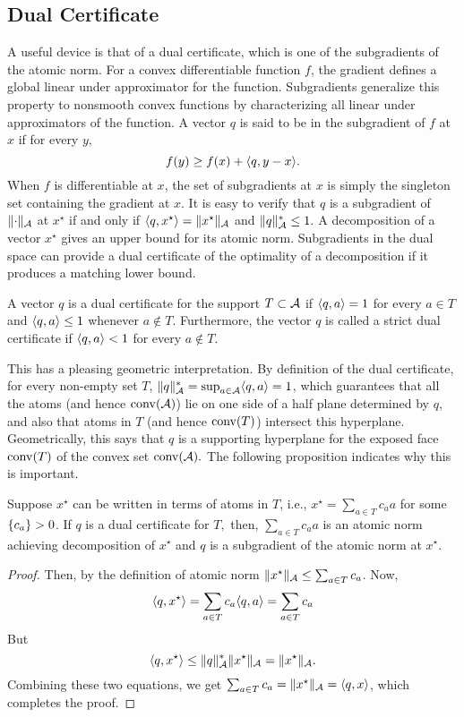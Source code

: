\subsection{Dual Certificate}

A useful device is that of a dual certificate, which is one of the subgradients
of the atomic norm. For a convex differentiable function $f$, the gradient
defines a global linear under approximator for the function. Subgradients
generalize this property to nonsmooth convex functions by characterizing all
linear under approximators of the function. A vector $q$ is said to be in the subgradient of $f$ at $x$ if for every $y,$
\[
	f(y) \geq f(x) + \langle q, y-x\rangle.
\]
When $f$ is differentiable at $x$, the set of subgradients at $x$ is simply the
singleton set containing the gradient at $x$. It is easy to verify that $q$ is a
subgradient of $\lVert\cdot\rVert_{\mathcal{A}} $ at $x^\star$ if and only if $\langle q,
x^\star \rangle = \lVert x^\star\rVert_{\mathcal{A}}$ and $\lVert q\rVert_{\mathcal{A}}^* \leq 1.$ A
decomposition of a vector $x^\star$ gives an upper bound for its atomic norm.
Subgradients in the dual space can provide a dual certificate of the optimality
of a decomposition if it produces a matching lower bound.

\begin{definition}\label{def:dual-certificate}
A vector $q$ is a dual certificate for the support $T \subset \mathcal{A}$ if 
$\langle q, a\rangle = 1$ for every $a \in T$ and $\langle q, a\rangle \leq 1$ whenever $a \not\in T$. Furthermore, the vector $q$ is called a strict dual certificate if $\langle q, a\rangle < 1$ for every $a \not\in T.$
\end{definition}

This has a pleasing geometric interpretation. By definition of the dual
certificate, for every non-empty set $T$, $\lVert q\rVert_{\mathcal{A}}^* = \sup_{a \in \mathcal{A}}
\langle q, a\rangle = 1$, which guarantees that all the atoms (and hence $\operatorname{conv}(\mathcal{A})$)
lie on one side of a half plane determined by $q$, and also that atoms in $T$
(and hence $\operatorname{conv}(T)$) intersect this hyperplane. Geometrically, this says that
$q$ is a supporting hyperplane for the exposed face $\operatorname{conv}(T)$ of the convex set
$\operatorname{conv}(\mathcal{A}).$ The following proposition indicates why this is important.

\begin{prop}
\label{prop:dual-certificate-is-subgrad}
Suppose $x^\star$ can be written in terms of atoms in $T$, i.e., $x^\star =
\sum_{a \in T} c_a a$ for some $\left\{ c_a \right\} > 0$. If $q$ is a dual certificate for
$T,$ then, $\sum_{a \in T} c_a a$ is an atomic norm achieving decomposition of
$x^\star$ and $q$ is a subgradient of the atomic norm at $x^\star.$
\end{prop}
\begin{proof}
	Then, by the definition of atomic norm $\lVert x^\star\rVert_{\mathcal{A}} \leq \sum_{a \in T} c_a$. Now, 
	\[
		\langle q, x^\star\rangle = \sum_{a \in T} c_a\langle q, a\rangle = \sum_{a \in T} c_a
	\]
	But 
	\[
		\langle q, x^\star\rangle \leq \lVert q\rVert_{\mathcal{A}}^* \lVert x^\star\rVert_{\mathcal{A}} = \lVert x^\star\rVert_{\mathcal{A}}.
	\]
	Combining these two equations, we get $\sum_{a \in T} c_a = \lVert x^\star\rVert_{\mathcal{A}} =
	\langle q, x\rangle$, which completes the proof.
\end{proof}

